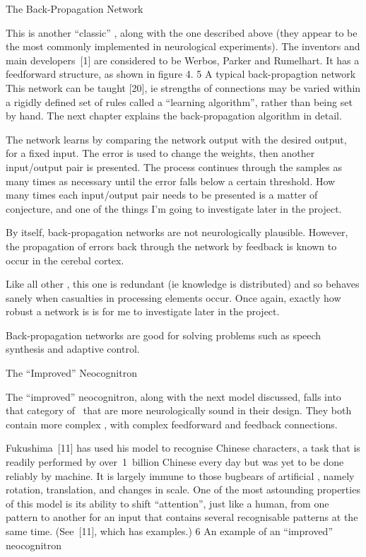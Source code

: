 \ssec The Back-Propagation Network

This is another ``classic'' \nn, along with the one described above
(they appear to be the most commonly implemented in neurological
experiments).
The inventors and main developers~[1] are considered to be Werbos,
Parker and Rumelhart.
It has a feedforward structure, as shown in figure 4.
 {5} {A typical back-propagtion network}
This network can be taught [20], ie strengths of connections may be varied
within a rigidly defined set of rules called a ``learning algorithm'',
rather than being set by hand.
The next chapter explains the back-propagation algorithm in detail.

The network learns by comparing the network output with the desired
output, for a fixed input.
The error is used to change the weights, then another input/output pair
is presented.
The process continues through the samples as many times as necessary
until the error falls below a certain threshold.
How many times each input/output pair needs to be presented is a matter
of conjecture, and one of the things I'm going to investigate later in
the project.

By itself, back-propagation networks are not neurologically plausible.
However, the propagation of errors back through the network by feedback
is known to occur in the cerebal cortex.

Like all other \nns, this one is redundant (ie knowledge is distributed)
and so behaves sanely when
casualties in processing elements occur.
Once again, exactly how robust a network is is for me to investigate later
in the project.

Back-propagation networks are good for solving problems such as speech
synthesis and adaptive control.

\ssec The ``Improved'' Neocognitron

The ``improved'' neocognitron, along with the next model discussed, falls 
into that category of \nns\ that are more neurologically sound in their
design.
They both contain more complex \neus, with complex feedforward and
feedback connections.

Fukushima~[11] has used his model to recognise Chinese characters, a
task that is readily performed by over~1~billion Chinese every day but
was yet to be done reliably by machine.
It is largely immune to those bugbears of artificial \nns, namely
rotation, translation, and changes in scale.
One of the most astounding properties of this model is its ability to
shift ``attention'', just like a human, from one pattern to another for
an input that contains several recognisable patterns at the same time.
(See~[11], which has examples.)
 {6} {An example of an ``improved'' neocognitron}

